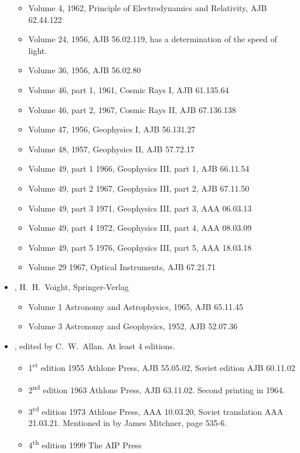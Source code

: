 \begin{itemize}
\begin{itemize}
  \item Volume 4, 1962, Principle of Electrodynamics and Relativity,
    AJB 62.44.122
  \item Volume 24, 1956, AJB 56.02.119, has a determination of the
    speed of light.
  \item Volume 36, 1956, AJB 56.02.80
  \item Volume 46, part 1, 1961, Cosmic Rays I, AJB 61.135.64
  \item Volume 46, part 2, 1967, Cosmic Rays II, AJB 67.136.138
    \item Volume 47, 1956, Geophysics I, AJB 56.131.27
  \item Volume 48, 1957, Geophysics II, AJB 57.72.17
  \item Volume 49, part 1 1966, Geophysics III, part 1, AJB 66.11.54
  \item Volume 49, part 2 1967, Geophysics III, part 2, AJB 67.11.50
  \item Volume 49, part 3 1971, Geophysics III, part 3, AAA 06.03.13
  \item Volume 49, part 4 1972, Geophysics III, part 4, AAA 08.03.09
  \item Volume 49, part 5 1976, Geophysics III, part 5, AAA 18.03.18
  \item Volume 29 1967, Optical Instruments, AJB 67.21.71
    
  \end{itemize}

\item {}, H.\ H.\ Voight,
  Springer-Verlag
  \begin{itemize}
  \item Volume 1 Astronomy and Astrophysics, 1965, AJB 65.11.45
  \item Volume 3 Astronomy and Geophysics, 1952, AJB 52.07.36
  \end{itemize}
  
  
\item {}, edited by C.\ W.\ Allan. At least
  4 editions.
  \begin{itemize}
  \item 1\textsuperscript{st} edition 1955 Athlone Press, AJB
    55.05.02, Soviet edition AJB 60.11.02
  \item 2\textsuperscript{nd} edition 1963 Athlone Press, AJB 63.11.02.
    Second printing in 1964.
  \item 3\textsuperscript{rd} edition 1973 Athlone Press, AAA
    10.03.20, Soviet translation AAA 21.03.21.  Mentioned in
     by James Mitchner, page 535-6.
  \item 4\textsuperscript{th} edition 1999 The AIP Press
  \end{itemize}


\end{itemize}
